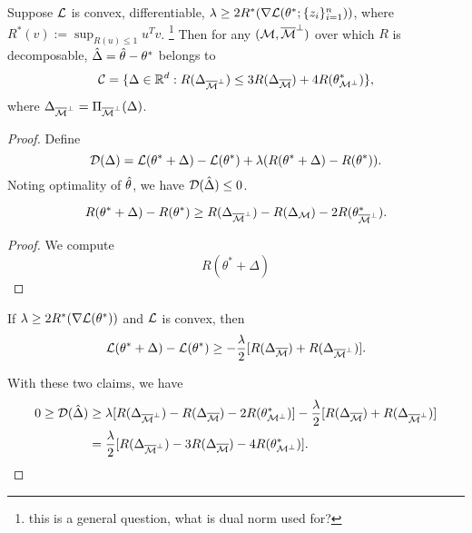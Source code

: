 \begin{pro} Suppose $\mathcal{L}$ is convex, differentiable,
    $\lambda\ge 2R^*(\nabla\mathcal{L}(\theta^*;\{z_i\}_{i=1}^n))$,
    where $R^*(v):=\sup_{R(u)\le 1}u^T v$.
    \footnote{this is a general question, what is dual norm used for?}
    Then for any $(\mathcal{M}, {\overline{\mathcal{M}}}^\perp)$ over which $R$ is decomposable,
    ${\hat\Delta} = {\hat{\theta}} - \theta^*$ belongs to
    \begin{equation}
        \mathcal{C}=\{\Delta\in{\mathbb{R}}^d:R(\Delta_{{\overline{\mathcal{M}}}^\perp})\le 3 R(\Delta_{{\overline{\mathcal{M}}}}) + 4R(\theta^*_{\mathcal{M}^\perp})\},
    \end{equation}
    where $\Delta_{{\overline{\mathcal{M}}}^\perp}=\Pi_{{\overline{\mathcal{M}}}^\perp}(\Delta)$.
\end{pro}

\begin{proof}
    Define
    \begin{equation}
        \mathcal{D}(\Delta)=\mathcal{L}(\theta^*+\Delta)-\mathcal{L}(\theta^*)+\lambda(R(\theta^*+\Delta)-R(\theta^*)).
    \end{equation}
    Noting optimality of ${\hat{\theta}}$, we have $\mathcal{D}({\hat\Delta})\le0$.

    \begin{claim}
        \begin{equation}
            R(\theta^*+\Delta)-R(\theta^*) \ge R(\Delta_{{\overline{\mathcal{M}}}^\perp})-R(\Delta_{\mathcal{M}})-2R(\theta^*_{{\overline{\mathcal{M}}}^\perp}).
        \end{equation}
    \end{claim}

    \begin{proof}
        We compute
        \begin{equation}
            R(\theta^*+\Delta)
        \end{equation}
    \end{proof}

    \begin{claim}
        If $\lambda\ge 2R^*(\nabla\mathcal{L}(\theta^*))$ and $\mathcal{L}$ is convex, then
        \begin{equation}
            \mathcal{L}(\theta^*+\Delta) -\mathcal{L}(\theta^*) \ge -\frac{\lambda}{2} [R(\Delta_{{\overline{\mathcal{M}}}})+R(\Delta_{{\overline{\mathcal{M}}}^\perp})].
        \end{equation}
    \end{claim}

    With these two claims, we have
    \begin{equation}
    \begin{split}
    0 \ge \mathcal{D}({\hat\Delta}) & \ge \lambda[R(\Delta_{{\overline{\mathcal{M}}}^\perp})-R(\Delta_{{\overline{\mathcal{M}}}})-2R(\theta^*_{\mathcal{M}^\perp})]
        -\frac{\lambda}{2}[R(\Delta_{{\overline{\mathcal{M}}}})+R(\Delta_{{\overline{\mathcal{M}}}^\perp})]  \\
    & = \frac{\lambda}{2}[R(\Delta_{{\overline{\mathcal{M}}}^\perp})-3R(\Delta_{{\overline{\mathcal{M}}}})-4R(\theta^*_{\mathcal{M}^\perp})].
    \end{split}
    \end{equation}
\end{proof}

